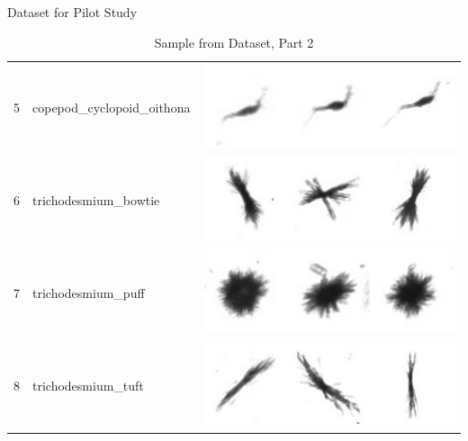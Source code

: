 \documentclass[mathserif]{beamer}
\begin{document}
\begin{frame}{Dataset for Pilot Study}
\vspace{-1cm}
\begin{table}[ht!]
\centering
\caption{Sample from Dataset, Part 2}
\begin{tabular}{m{3pt} m{130pt} | m{120pt}}
\toprule
5 & copepod\_cyclopoid\_oithona & \includegraphics[scale=0.4]{./fig/copepod_cyclopoid_oithona.png}\\
6 & trichodesmium\_bowtie & \includegraphics[scale=0.4]{./fig/trichodesmium_bowtie.png}\\
7 & trichodesmium\_puff & \includegraphics[scale=0.4]{./fig/trichodesmium_puff.png}\\
8 & trichodesmium\_tuft & \includegraphics[scale=0.4]{./fig/trichodesmium_tuft.png}\\
\bottomrule
\end{tabular}
\end{table}
\end{frame}
\end{document}
